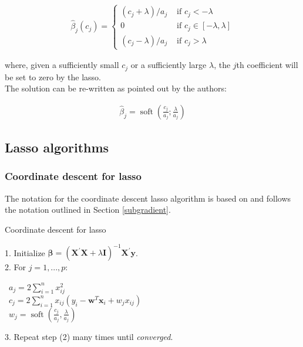 \begin{align*}
\hat{\beta}_{j}\left(c_{j}\right)=\left\{\begin{array}{cc}\left(c_{j}+\lambda\right) / a_{j} & \text { if } c_{j}<-\lambda \\ 0 & \text { if } c_{j} \in[-\lambda, \lambda] \\ \left(c_{j}-\lambda\right) / a_{j} & \text { if } c_{j}>\lambda\end{array}\right.
\end{align*}

\noindent where, given a sufficiently small $c_j$ or a sufficiently large $\lambda$, the $j$th coefficient will be set to zero by the lasso. \\

\noindent The solution can be re-written as pointed out by the authors:

\begin{align*}
    \hat{\beta}_{j}=\operatorname{soft}\left(\frac{c_{j}}{a_{j}} ; \frac{\lambda}{a_{j}}\right)
\end{align*}

\subsection{Lasso algorithms}\label{algorithms}

\subsubsection{Coordinate descent for lasso}

\noindent The notation for the coordinate descent lasso algorithm is based on \cite{murphy2012machine} and follows the notation outlined in Section \ref{subgradient}.

\begin{algorithm}[H]
\caption{Coordinate descent for lasso}\label{alg:1}
1. Initialize $\mathbf{\beta}=\left(\mathbf{X}^{\prime} \mathbf{X}+\lambda \mathbf{I}\right)^{-1} \mathbf{X}^{\prime} \mathbf{y}$. \\
2. For $j=1,...,p$: 
\begin{enumerate}
    \  $a_{j}=2 \sum_{i=1}^{n} x_{i j}^{2}$ \\
    \  $c_{j}=2 \sum_{i=1}^{n} x_{i j}\left(y_{i}-\mathbf{w}^{T} \mathbf{x}_{i}+w_{j} x_{i j}\right)$ \\
    \  $w_{j}=\operatorname{soft}\left(\frac{c_{j}}{a_{j}}, \frac{\lambda}{a_{j}}\right)$
\end{enumerate}
3. Repeat step (2) many times until \textit{converged}.
\end{algorithm}

